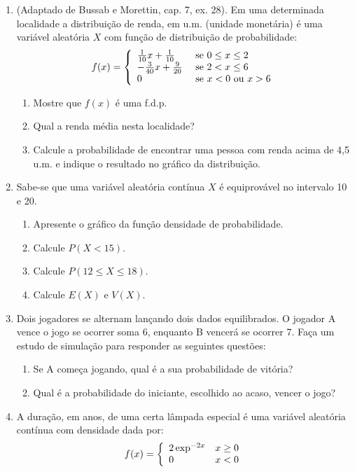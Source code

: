 \documentclass[
  10pt,
  a4paper]{book}
\providecommand{\tightlist}{%
  \setlength{\itemsep}{0pt}\setlength{\parskip}{0pt}}
\begin{document}
\begin{enumerate}
\def\labelenumi{\arabic{enumi}.}
\tightlist
\item
  (Adaptado de Bussab e Morettin, cap. 7, ex. 28). Em uma determinada
  localidade a distribuição de renda, em u.m. (unidade monetária) é uma
  variável aleatória \(X\) com função de distribuição de probabilidade:
  \[
  f(x) = \left\{ \begin{array}{ll}
       \frac{1}{10}x + \frac{1}{10} & \mbox{ se $0 \leq x \leq 2$} \cr
       -\frac{3}{40}x + \frac{9}{20} & \mbox{ se $ 2 < x \leq 6$} \cr
       0      &      \mbox{ se $x < 0$  ou  $x > 6$}
     \end{array} \right.
  \]

  \begin{enumerate}
  \def\labelenumii{\alph{enumii}.}
  \tightlist
  \item
    Mostre que \(f(x)\) é uma f.d.p.
  \item
    Qual a renda média nesta localidade?
  \item
    Calcule a probabilidade de encontrar uma pessoa com renda acima
    de 4,5 u.m. e indique o resultado no gráfico da distribuição.
  \end{enumerate}
\item
  Sabe-se que uma variável aleatória contínua \(X\) é equiprovável no intervalo 10 e 20.

  \begin{enumerate}
  \def\labelenumii{\alph{enumii}.}
  \tightlist
  \item
    Apresente o gráfico da função densidade de probabilidade.
  \item
    Calcule \(P(X < 15)\).
  \item
    Calcule \(P(12 \leq X \leq 18)\).
  \item
    Calcule \(E(X)\) e \(V(X)\).
  \end{enumerate}
\item
  Dois jogadores se alternam lançando dois dados equilibrados. O jogador A vence o jogo se ocorrer soma 6, enquanto B vencerá se ocorrer 7. Faça um estudo de simulação para responder as seguintes questões:

  \begin{enumerate}
  \def\labelenumii{\alph{enumii}.}
  \tightlist
  \item
    Se A começa jogando, qual é a sua probabilidade de vitória?
  \item
    Qual é a probabilidade do iniciante, escolhido ao acaso, vencer o jogo?
  \end{enumerate}
\item
  A duração, em anos, de uma certa lâmpada especial é uma variável aleatória contínua com densidade dada por:
  \[
  f(x) = \left\{ \begin{array}{ll}
       2 \exp^{-2x} & x \geq 0 \cr
       0 & x < 0
     \end{array} \right.
  \]


\end{enumerate}
\end{document}

